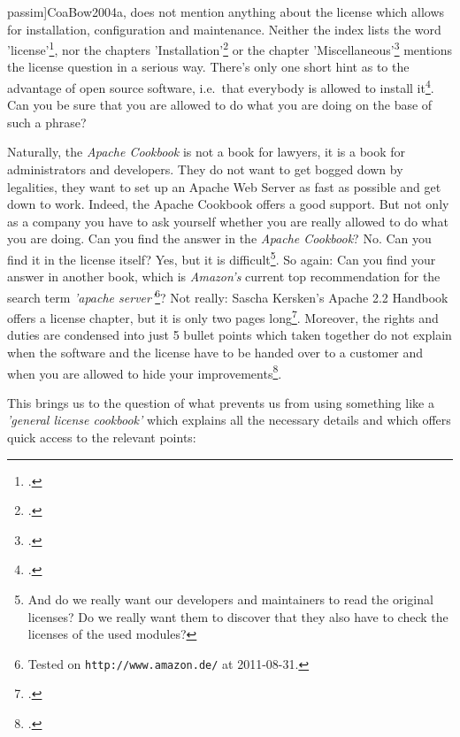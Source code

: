 passim]{CoaBow2004a}, does not mention anything about the license which allows
for installation, configuration and maintenance. Neither the index lists the
word 'license'\footcite[cf.][245ff, esp.\ p.\ 250]{CoaBow2004a}, nor the chapters
'Installation'\footcite[cf.][1ff]{CoaBow2004a} or the chapter
'Miscellaneous'\footcite[cf.][219ff]{CoaBow2004a} mentions the license question
in a serious way. There's only one short hint as to the advantage of open source
software, i.e.\ that everybody is allowed to install it\footcite[cf.][1: \enquote{%
\ldots einer der Vorzüge von open source software besteht darin, dass
je\-der\-mann die Erlaubnis zur Erzeugung eines eigenen Installationskits hat
}]{CoaBow2004a}. Can you be sure that you are allowed to do what you are
doing on the base of such a phrase?

Naturally, the \emph{Apache Cookbook} is not a book for lawyers, it is a book for
administrators and developers. They do not want to get bogged down by
legalities, they want to set up an Apache Web Server as fast as possible and get
down to work. Indeed, the Apache Cookbook offers a good support. But not only as
a company you have to ask yourself whether you are really allowed to do what you
are doing. Can you find the answer in the \emph{Apache Cookbook}? No. Can you
find it in the license itself? Yes, but it is difficult\footnote{And do we
really want our developers and maintainers to read the original licenses? Do we
really want them to discover that they also have to check the licenses of the
used modules?}. So again: Can you find your answer in another book, which is
\emph{Amazon's} current top recommendation for the search term \emph{'apache
server'}\footnote{Tested on \texttt{http://www.amazon.de/} at 2011-08-31.}? Not
really: Sascha Kersken's Apache 2.2 Handbook offers a license chapter, but it is
only two pages long\footcite[cf.][111f]{Kersken2009a}. Moreover, the rights and
duties are condensed into just 5 bullet points which taken together do not
explain when the software and the license have to be handed over to a customer
and when you are allowed to hide your
improvements\footcite[cf.][112]{Kersken2009a}.

This brings us to the question of what prevents us from using something like a
\emph{'general license cookbook'} which explains all the necessary details and
which offers  quick access to the relevant points:

